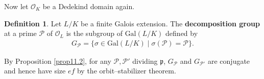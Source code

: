 \documentclass{article}
\theoremstyle{definition}
\newtheorem{defn}{Definition}[section]
\begin{document}
\vspace{1mm}
Now let $\mathcal{O}_K$ be a Dedekind domain again.
\begin{defn}
    Let $L/K$ be a finite Galois extension. The \textbf{decomposition group} at a prime $\mathcal{P}$ of $\mathcal{O}_L$ is the subgroup of $\text{Gal}(L/K)$ defined by 
    \begin{align*}
        G_{\mathcal{P}} = \{\sigma \in \text{Gal}(L/K) \mid \sigma(\mathcal{P}) = \mathcal{P}\}.
    \end{align*}
\end{defn}
By Proposition \ref{prop11.2}, for any $\mathcal{P}, \mathcal{P}'$ dividing $\mathfrak{p}$, $G_{\mathcal{P}}$ and $G_{\mathcal{P}'}$ are conjugate and hence have size $ef$ by the orbit--stabilizer theorem.
\end{document}
